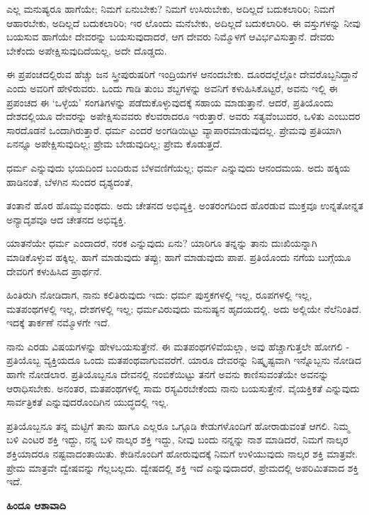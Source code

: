 ಎಲ್ಲ ಮನುಷ್ಯರೂ ಹಾಗೆಯೇ; ನಿಮಗೆ ಏನುಬೇಕು? ನಿಮಗೆ ಉಸಿರುಬೇಕು, ಅದಿಲ್ಲದೆ ಬದುಕಲಾರಿರಿ; ನಿಮಗೆ ಆಹಾರಬೇಕು, ಅದಿಲ್ಲದೆ ಬದುಕಲಾರಿರಿ; ಇರ ಲೊಂದು ಮನೆಬೇಕು, ಅದಿಲ್ಲದೆ ಬದುಕಲಾರಿರಿ. ಈ ವಸ್ತುಗಳನ್ನು ನೀವು ಬಯಸುವ ಹಾಗೆಯೇ ದೇವರನ್ನು ಬಯಸುವುದಾದರೆ, ಆಗ ದೇವರು ನಿಮ್ಮೊಳಗೆ ಆವಿರ್ಭವಿಸುತ್ತಾನೆ. ದೇವರು ಬೇಕೆಂದು ಅಪೇಕ್ಷಿಸುವುದಿದೆಯಲ್ಲ, ಅದೇ ದೊಡ್ಡದು.

ಈ ಪ್ರಪಂಚದಲ್ಲಿರುವ ಹೆಚ್ಚು ಜನ ಸ್ತ್ರೀಪುರುಷರಿಗೆ ಇಂದ್ರಿಯಗಳ ಆನಂದಬೇಕು. ದೂರದಲ್ಲೆಲ್ಲೋ ದೇವರೊಬ್ಬನಿದ್ದಾನೆ ಎಂದು ಅವರಿಗೆ ಹೇಳಿರುವರು. ಒಂದು ಗಾಡಿ ತುಂಬ ಶಬ್ದಗಳನ್ನು ಅವನಿಗೆ ಕಳುಹಿಸಿಕೊಟ್ಟರೆ, ಅವನು ಇಲ್ಲಿ ಈ ಪ್ರಪಂಚದ ಈ ‘ಒಳ್ಳೆಯ’ ಸಂಗತಿಗಳನ್ನು ಪಡೆದುಕೊಳ್ಳುವುದಕ್ಕೆ ಸಹಾಯ ಮಾಡುತ್ತಾನೆ. ಆದರೆ, ಪ್ರತಿಯೊಂದು ದೇಶದಲ್ಲಿಯೂ ದೇವರನ್ನು ಅಪೇಕ್ಷಿಸುವವರು ಕೆಲವರಾದರೂ ಇರುತ್ತಾರೆ. ಅವರು ಸತ್ಯವೆಂಬುದರ, ಒಳಿತು ಎಂಬುದರ ಸಾರದೊಡನೆ ಒಂದಾಗಿರುತ್ತಾರೆ. ಧರ್ಮ ಎಂದರೆ ಅಂಗಡಿಯಿಟ್ಟು ವ್ಯಾಪಾರಮಾಡುವುದಲ್ಲ. ಪ್ರೇಮವು ಪ್ರತಿಯಾಗಿ ಏನನ್ನೂ ಅಪೇಕ್ಷಿಸುವುದಿಲ್ಲ; ಪ್ರೇಮ ಬೇಡುವುದಿಲ್ಲ; ಪ್ರೇಮ ಕೊಡುತ್ತದೆ.

ಧರ್ಮ ಎನ್ನುವುದು ಭಯದಿಂದ ಬಂದಿರುವ ಬೆಳವಣಿಗೆಯಲ್ಲ; ಧರ್ಮ ಎನ್ನುವುದು ಆನಂದಮಯ. ಅದು ಹಕ್ಕಿಯ ಹಾಡಿನಂತೆ, ಬೆಳಗಿನ ಸುಂದರ ದೃಶ್ಯದಂತೆ,

ತಂತಾನೆ ಹೊರ ಹೊಮ್ಮುವಂಥದು. ಅದು ಚೇತನದ ಅಭಿವ್ಯಕ್ತಿ. ಅಂತರಂಗದಿಂದ ಹೊರಡುವ ಮುಕ್ತವೂ ಉನ್ನತೋನ್ನತ ಅನ್ಯಾದೃಶವೂ ಆದ ಚೇತನದ ಅಭಿವ್ಯಕ್ತಿ.

ಯಾತನೆಯೇ ಧರ್ಮ ಎಂದಾದರೆ, ನರಕ ಎನ್ನುವುದು ಏನು? ಯಾರಿಗೂ ತನ್ನನ್ನು ತಾನು ದುಃಖಿಯನ್ನಾಗಿ ಮಾಡಿಕೊಳ್ಳುವ ಹಕ್ಕಿಲ್ಲ. ಹಾಗೆ ಮಾಡುವುದು ತಪ್ಪು; ಹಾಗೆ ಮಾಡುವುದು ಪಾಪ. ಪ್ರತಿಯೊಂದು ನಗೆಯ ಬುಗ್ಗೆಯೂ ದೇವರಿಗೆ ಕಳುಹಿಸಿದ ಪ್ರಾರ್ಥನೆ.

ಹಿಂತಿರುಗಿ ನೋಡಿದಾಗ, ನಾನು ಕಲಿತಿರುವುದು ಇದು: ಧರ್ಮ ಪುಸ್ತಕಗಳಲ್ಲಿ ಇಲ್ಲ, ರೂಪಗಳಲ್ಲಿ ಇಲ್ಲ, ಮತಪಂಥಗಳಲ್ಲಿ ಇಲ್ಲ, ದೇಶಗಳಲ್ಲಿ ಇಲ್ಲ; ಧರ್ಮವಿರುವುದು ಮನುಷ್ಯನ ಹೃದಯದಲ್ಲಿ. ಅದು ಅಲ್ಲಿಯೇ ನೆಲೆನಿಂತಿದೆ. ಇದಕ್ಕೆ ತಾರ್ಕಣೆ ನಮ್ಮೊಳಗೇ ಇದೆ.

ನಾನು ಎರಡು ವಿಷಯಗಳನ್ನು ಹೇಳಬಯಸುತ್ತೇನೆ. ಈ ಮತಪಂಥಗಳಿವೆಯಲ್ಲಾ, ಅವು ಹೆಚ್ಚಾಗುತ್ತಲೇ ಹೋಗಲಿ - ಪ್ರತಿಯೊಬ್ಬ ವ್ಯಕ್ತಿಯದೂ ಒಂದು ಮತಪಂಥವಾಗುವವರೆಗೆ. ಯಾರೂ ದೇವರನ್ನು ನಿಷ್ಕೃಷ್ಟವಾಗಿ ಇನ್ನೊಬ್ಬನು ನೋಡಿದ ಹಾಗೇ ನೋಡಲಾರ. ಪ್ರತಿಯೊಬ್ಬನೂ ದೇವನಲ್ಲಿ ನಂಬಿಕೆಯಿಟ್ಟು ತನಗೆ ಅವನು ಕಾಣಿಸುವಂತೆಯೇ ಅವನನ್ನು ಆರಾಧಿಸಬೇಕು. ಅನಂತರ, ಮತಪಂಥಗಳಲ್ಲಿ ಸಾಮ ರಸ್ಯವಿರಬೇಕೆಂದು ನಾನು ಬಯಸುತ್ತೇನೆ. ವೈಯಕ್ತಿಕತೆ ಎನ್ನುವುದು ಸಾರ್ವತ್ರಿಕತೆ ಎನ್ನುವುದರೊಂದಿಗಿನ ಯುದ್ಧದಲ್ಲಿ ಇಲ್ಲ.

ಪ್ರತಿಯೊಬ್ಬನೂ ತನ್ನ ಮಟ್ಟಿಗೆ ತಾನು ಹಾಗೂ ಎಲ್ಲರೂ ಒಗ್ಗೂಡಿ ಕೇಡುಗಳೊಂದಿಗೆ ಹೋರಾಡುವಂತೆ ಆಗಲಿ. ನಿಮ್ಮ ಬಳಿ ಎಂಟರ ಶಕ್ತಿ ಇದ್ದು, ನನ್ನ ಬಳಿ ನಾಲ್ಕರ ಶಕ್ತಿ ಇದ್ದು, ನೀವು ಬಂದು ನನ್ನನ್ನು ನಾಶ ಮಾಡಿದರೆ, ನಿಮಗೆ ನಾಲ್ಕರ ಶಕ್ತಿಯಾದರೂ ನಷ್ಟವಾದಂತಾಯಿತು. ಕೇಡಿನೊಂದಿಗೆ ಹೋರುವುದಕ್ಕೆ ನಿಮಗೆ ಉಳಿಯುವುದು ನಾಲ್ಕರ ಶಕ್ತಿ ಮಾತ್ರವೇ. ಪ್ರೇಮ ಮಾತ್ರವೇ ದ್ವೇಷವನ್ನು ಗೆಲ್ಲಬಲ್ಲದು. ದ್ವೇಷದಲ್ಲಿ ಶಕ್ತಿ ಇದೆ ಎನ್ನುವುದಾದರೆ, ಪ್ರೇಮದಲ್ಲಿ ಅಪರಿಮಿತವಾದ ಶಕ್ತಿ ಇದೆ.

\begin{center}
\textbf{ಹಿಂದೂ ಆಶಾವಾದಿ}
\end{center}

